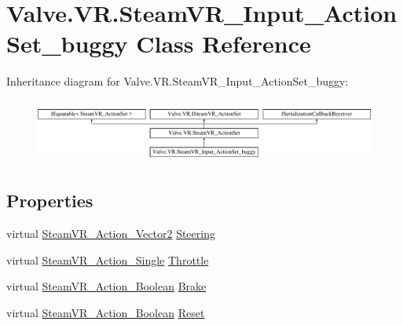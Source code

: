 \hypertarget{class_valve_1_1_v_r_1_1_steam_v_r___input___action_set__buggy}{}\section{Valve.\+V\+R.\+Steam\+V\+R\+\_\+\+Input\+\_\+\+Action\+Set\+\_\+buggy Class Reference}
\label{class_valve_1_1_v_r_1_1_steam_v_r___input___action_set__buggy}
Inheritance diagram for Valve.\+V\+R.\+Steam\+V\+R\+\_\+\+Input\+\_\+\+Action\+Set\+\_\+buggy\+:\begin{figure}[H]
\begin{center}
\leavevmode
\includegraphics[height=2.105263cm]{class_valve_1_1_v_r_1_1_steam_v_r___input___action_set__buggy}
\end{center}
\end{figure}
\subsection*{Properties}
\begin{DoxyCompactItemize}
\item 
virtual \mbox{\hyperlink{class_valve_1_1_v_r_1_1_steam_v_r___action___vector2}{Steam\+V\+R\+\_\+\+Action\+\_\+\+Vector2}} \mbox{\hyperlink{class_valve_1_1_v_r_1_1_steam_v_r___input___action_set__buggy_af34f4b348c79d361f6a244d818d04d69}{Steering}}
\item 
virtual \mbox{\hyperlink{class_valve_1_1_v_r_1_1_steam_v_r___action___single}{Steam\+V\+R\+\_\+\+Action\+\_\+\+Single}} \mbox{\hyperlink{class_valve_1_1_v_r_1_1_steam_v_r___input___action_set__buggy_a46c6623ba08906f2a12ccb28af62cb47}{Throttle}}
\item 
virtual \mbox{\hyperlink{class_valve_1_1_v_r_1_1_steam_v_r___action___boolean}{Steam\+V\+R\+\_\+\+Action\+\_\+\+Boolean}} \mbox{\hyperlink{class_valve_1_1_v_r_1_1_steam_v_r___input___action_set__buggy_a1441986d639b574dc0dc8f993db0a8a3}{Brake}}
\item 
virtual \mbox{\hyperlink{class_valve_1_1_v_r_1_1_steam_v_r___action___boolean}{Steam\+V\+R\+\_\+\+Action\+\_\+\+Boolean}} \mbox{\hyperlink{class_valve_1_1_v_r_1_1_steam_v_r___input___action_set__buggy_a1b1442d70fb8e37e12fdd3870c43bcb3}{Reset}}
\end{DoxyCompactItemize}
